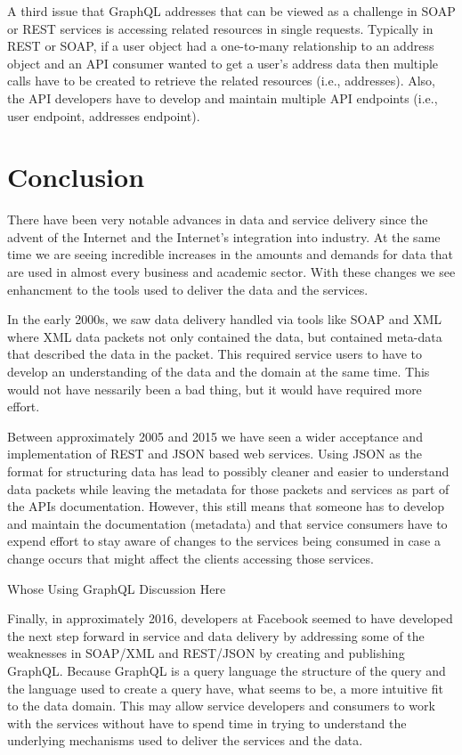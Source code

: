 A third issue that GraphQL addresses that can be viewed as a challenge in SOAP 
or REST services is accessing related resources in single requests\cite{FacebookGraphQL2018}.  
Typically in REST or SOAP, if a user object had a one-to-many relationship to 
an address object and an API consumer wanted to get a user's address data then 
multiple calls have to be created to retrieve the related resources 
(i.e., addresses).  Also, the API developers have to develop and maintain 
multiple API endpoints (i.e., user endpoint, addresses endpoint).

\section{Conclusion}
There have been very notable advances in data and service delivery since the 
advent of the Internet and the Internet's integration into industry.  At the 
same time we are seeing incredible increases in the amounts and demands for 
data that are used in almost every business and academic sector.  With these 
changes we see enhancment to the tools used to deliver the data and the 
services.  

In the early 2000s, we saw data delivery handled via tools like SOAP and XML 
where XML data packets not only contained the data, but contained meta-data 
that described the data in the packet.  This required service users to have to 
develop an understanding of the data and the domain at the same time.  This 
would not have nessarily been a bad thing, but it would have required more 
effort.

Between approximately 2005 and 2015 we have seen a wider acceptance and 
implementation of REST and JSON based web services.  Using JSON as the format 
for structuring data has lead to possibly cleaner and easier to understand 
data packets while leaving the metadata for those packets and services as part 
of the APIs documentation.  However, this still means that someone has to 
develop and maintain the documentation (metadata) and that service consumers 
have to expend effort to stay aware of changes to the services being consumed 
in case a change occurs that might affect the clients accessing those services.

Whose Using GraphQL Discussion Here

Finally, in approximately 2016, developers at Facebook seemed to have 
developed the next step forward in service and data delivery by addressing some 
of the weaknesses in SOAP/XML and REST/JSON by creating and publishing GraphQL.
Because GraphQL is a query language the structure of the query and the language 
used to create a query have, what seems to be, a more intuitive fit to the data 
domain.  This may allow service developers and consumers to work with the 
services without have to spend time in trying to understand the underlying 
mechanisms used to deliver the services and the data.

